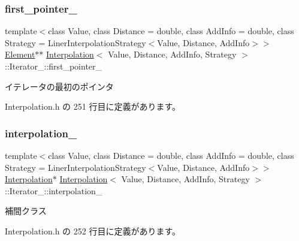 \subsubsection{\texorpdfstring{first\+\_\+pointer\+\_\+}{first\_pointer\_}}
{\footnotesize\ttfamily template$<$class Value, class Distance = double, class Add\+Info = double, class Strategy = Liner\+Interpolation\+Strategy$<$\+Value, Distance, Add\+Info$>$$>$ \\
\mbox{\hyperlink{class_interpolation_a01e71544809483d7a2ee72fe0007bcb0}{Element}}$\ast$$\ast$ \mbox{\hyperlink{class_interpolation}{Interpolation}}$<$ Value, Distance, Add\+Info, Strategy $>$\+::Iterator\+\_\+\+::first\+\_\+pointer\+\_\+\hspace{0.3cm}{\ttfamily [private]}}



イテレータの最初のポインタ 



 Interpolation.\+h の 251 行目に定義があります。

\mbox{\label{class_interpolation_1_1_iterator___a0205ea80def2848af9e388e12a4bbaf8}} 
\subsubsection{\texorpdfstring{interpolation\+\_\+}{interpolation\_}}
{\footnotesize\ttfamily template$<$class Value, class Distance = double, class Add\+Info = double, class Strategy = Liner\+Interpolation\+Strategy$<$\+Value, Distance, Add\+Info$>$$>$ \\
\mbox{\hyperlink{class_interpolation}{Interpolation}}$\ast$ \mbox{\hyperlink{class_interpolation}{Interpolation}}$<$ Value, Distance, Add\+Info, Strategy $>$\+::Iterator\+\_\+\+::interpolation\+\_\+\hspace{0.3cm}{\ttfamily [private]}}



補間クラス 



 Interpolation.\+h の 252 行目に定義があります。

\mbox{\label{class_interpolation_1_1_iterator___a181cd3e72e883edd269ae2a2cc64bcde}} 
